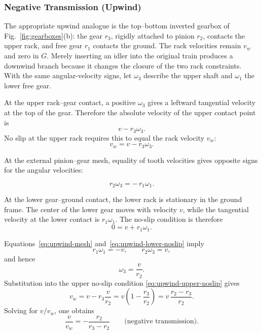 \documentclass[reprint,aps,pra,longbibliography]{revtex4-2}
\begin{document}
\subsubsection{Negative Transmission (Upwind)}


The appropriate upwind analogue is the top--bottom inverted gearbox of Fig.~\ref{fig:gearboxes}(b): the gear \(r_3\), rigidly attached to pinion \(r_2\), contacts the upper rack, and free gear \(r_1\) contacts the ground. The rack velocities remain \(v_w\) and zero in \(G\). Merely inserting an idler into the original train produces a downwind branch because it changes the closure of the two rack constraints. With the same angular-velocity signs, let \(\omega_3\) describe the upper shaft and \(\omega_1\) the lower free gear.


At the upper rack--gear contact, a positive \(\omega_3\) gives a leftward
tangential velocity at the top of the gear.  Therefore the absolute velocity
of the upper contact point is
\[
v-r_3\omega_3 .
\]
No slip at the upper rack requires this to equal the rack velocity \(v_w\):
\begin{equation}
v_w = v-r_3\omega_3 .
\label{eq:upwind-upper-noslip}
\end{equation}


At the external pinion--gear mesh, equality of tooth velocities gives opposite signs for the angular velocities:

\begin{equation}
r_2\omega_3 = -\,r_1\omega_1 .
\label{eq:upwind-mesh}
\end{equation}

At the lower gear--ground contact, the lower rack is stationary in the ground
frame.  The center of the lower gear moves with velocity \(v\), while the
tangential velocity at the lower contact is \(r_1\omega_1\).  The no-slip
condition is therefore
\begin{equation}
0 = v+r_1\omega_1 .
\label{eq:upwind-lower-noslip}
\end{equation}

Equations~\eqref{eq:upwind-mesh} and~\eqref{eq:upwind-lower-noslip} imply
\[
r_1\omega_1=-v,
\qquad
r_2\omega_3=v,
\]
and hence
\[
\omega_3=\frac{v}{r_2}.
\]
Substitution into the upper no-slip condition
\eqref{eq:upwind-upper-noslip} gives
\[
v_w
 =
v-r_3\frac{v}{r_2}
 =
v\left(1-\frac{r_3}{r_2}\right)
 =
v\,\frac{r_2-r_3}{r_2}.
\]
Solving for \(v/v_w\), one obtains
\begin{equation}
\frac{v}{v_w}
=
-\frac{r_2}{r_3-r_2}
\qquad\text{(negative transmission).}
\label{eq:upwind-v-vw-ratio}
\end{equation}
\end{document}
